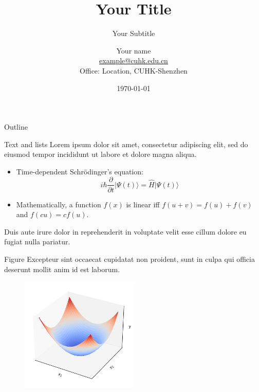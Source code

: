 \documentclass{beamer}
\title[Short title]{Your Title}
\subtitle{Your Subtitle}
\author[Short name]{
	Your name \\
	\vspace{0.1in}
	\footnotesize{\href{mailto:example@cuhk.edu.cn}{example@cuhk.edu.cn}}\\
	\footnotesize{Office: Location, CUHK-Shenzhen}}
\institute[CUHK-Shenzhen]{The Chinese University of Hong Kong, Shenzhen}
\date{\today}
\begin{document}
	
	
	\frame[plain]{\maketitle}
	
	\begin{frame}{Outline}
		\label{outline}
		\tableofcontents{}
	\end{frame}
	
	
	\begin{frame}{Text and lists}
		Lorem ipsum dolor sit amet, consectetur adipiscing elit, sed do eiusmod tempor incididunt ut labore et dolore magna aliqua. \pause
		\begin{itemize}
			\item Time-dependent Schr\"{o}dinger's equation: $$i \hbar \frac{\partial}{\partial t}\lvert\Psi(t)\rangle = \hat H \lvert\Psi(t)\rangle$$ \pause
			\item Mathematically, a function $f(x)$ is linear iff $f(u+v)=f(u)+f(v)$ and $f(cu)=cf(u)$. \pause
		\end{itemize} \pause
		\vspace{0.1in}
		Duis aute irure dolor in reprehenderit in voluptate velit esse cillum dolore eu fugiat nulla pariatur. \pause
	\end{frame}
	
	\begin{frame}{Figure}
		Excepteur sint occaecat cupidatat non proident, sunt in culpa qui officia deserunt mollit anim id est laborum.
		\begin{figure}
			\includegraphics[width=0.5\textwidth]{images/convex_surface.png}
		\end{figure}
	\end{frame}
	
\end{document}
